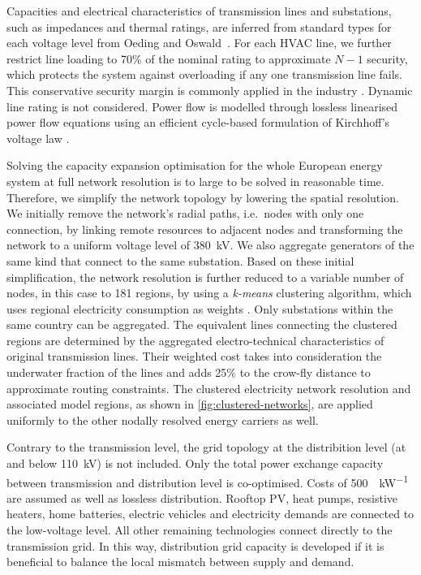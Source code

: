 
Capacities and electrical characteristics of transmission lines and substations,
such as impedances and thermal ratings, are
inferred from standard types for each voltage level from Oeding and Oswald~. For each HVAC
line, we further restrict line loading to 70\% of the nominal rating to
approximate $N-1$ security, which protects the system against overloading if any
one transmission line fails. This conservative security margin is commonly
applied in the industry . Dynamic line rating is not considered. Power
flow is modelled through lossless linearised power flow equations using an
efficient cycle-based formulation of Kirchhoff's voltage law
.


Solving the capacity expansion optimisation for the whole European energy system
at full network resolution is to large to be solved in reasonable time.
Therefore, we simplify the network topology by lowering the spatial resolution.
We initially remove the network's radial paths, i.e.~nodes with only one
connection, by linking remote resources to adjacent nodes and transforming the
network to a uniform voltage level of \SI{380}{\kilo\volt}. We also aggregate
generators of the same kind that connect to the same substation. Based on these
initial simplification, the network resolution is further reduced to a variable
number of nodes, in this case to 181 regions, by using a \textit{k-means}
clustering algorithm, which uses regional electricity consumption as weights
. Only substations within the
same country can be aggregated. The equivalent lines connecting the clustered
regions are determined by the aggregated electro-technical characteristics of
original transmission lines. Their weighted cost takes into consideration the
underwater fraction of the lines and adds 25\% to the crow-fly distance to
approximate routing constraints. The clustered electricity network resolution
and associated model regions, as shown in \cref{fig:clustered-networks}, are
applied uniformly to the other nodally resolved energy carriers as well.


Contrary to the transmission level, the grid topology at the distribition level
(at and below \SI{110}{\kilo\volt}) is not included. Only the total power
exchange capacity between transmission and distribution level is co-optimised.
Costs of \SI{500}{\sieuro\per\kilo\watt} are assumed as well as lossless
distribution. Rooftop PV, heat pumps, resistive heaters, home batteries,
electric vehicles and electricity demands are connected to the low-voltage
level. All other remaining technologies connect directly to the transmission
grid. In this way, distribution grid capacity is developed if it is beneficial
to balance the local mismatch between supply and demand.